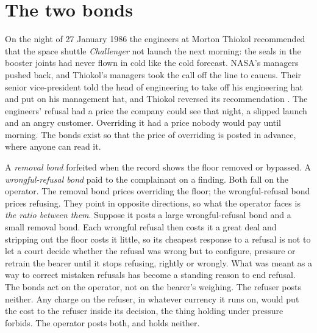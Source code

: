 \section{The two bonds}
\label{sec:13.6}
On the night of 27 January 1986 the engineers at Morton Thiokol recommended that the space shuttle \emph{Challenger} not launch the next morning: the seals in the booster joints had never flown in cold like the cold forecast. NASA's managers pushed back, and Thiokol's managers took the call off the line to caucus. Their senior vice-president told the head of engineering to take off his engineering hat and put on his management hat, and Thiokol reversed its recommendation \autocite{rogers1986report}. The engineers' refusal had a price the company could see that night, a slipped launch and an angry customer. Overriding it had a price nobody would pay until morning. The bonds exist so that the price of overriding is posted in advance, where anyone can read it.

A \emph{removal bond} forfeited when the record shows the floor removed or bypassed. A \emph{wrongful-refusal bond} paid to the complainant on a finding. Both fall on the operator. The removal bond prices overriding the floor; the wrongful-refusal bond prices refusing. They point in opposite directions, so what the operator faces is \emph{the ratio between them}. Suppose it posts a large wrongful-refusal bond and a small removal bond. Each wrongful refusal then costs it a great deal and stripping out the floor costs it little, so its cheapest response to a refusal is not to let a court decide whether the refusal was wrong but to configure, pressure or retrain the bearer until it stops refusing, rightly or wrongly. What was meant as a way to correct mistaken refusals has become a standing reason to end refusal. The bonds act on the operator, not on the bearer's weighing.
The refuser posts neither. Any charge on the refuser, in whatever currency it runs on, would put the cost to the refuser inside its decision, the thing holding under pressure forbids. The operator posts both, and holds neither.

